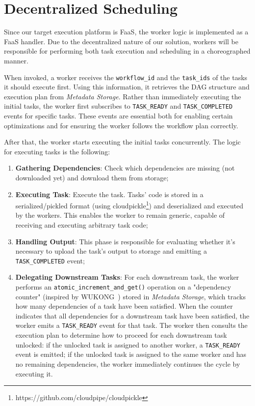 
\section{Decentralized Scheduling}

Since our target execution platform is FaaS, the worker logic is implemented as a FaaS handler. Due to the decentralized nature of our solution, workers will be responsible for performing both task execution and scheduling in a choreographed manner. 

When invoked, a worker receives the \texttt{workflow\_id} and the \texttt{task\_ids} of the tasks it should execute first. Using this information, it retrieves the DAG structure and execution plan from \textit{Metadata Storage}. Rather than immediately executing the initial tasks, the worker first subscribes to \texttt{TASK\_READY} and \texttt{TASK\_COMPLETED} events for specific tasks. These events are essential both for enabling certain optimizations and for ensuring the worker follows the workflow plan correctly.

After that, the worker starts executing the initial tasks concurrently. The logic for executing tasks is the following:
\begin{enumerate}
    \item \textbf{Gathering Dependencies}: Check which dependencies are missing (not downloaded yet) and download them from storage;
    \item \textbf{Executing Task}: Execute the task. Tasks' code is stored in a serialized/pickled format (using cloudpickle\footnote{https://github.com/cloudpipe/cloudpickle}) and deserialized and executed by the workers. This enables the worker to remain generic, capable of receiving and executing arbitrary task code;
    \item \textbf{Handling Output}: This phase is responsible for evaluating whether it's necessary to upload the task's output to storage and emitting a \texttt{TASK\_COMPLETED} event;
    \item \textbf{Delegating Downstream Tasks}: For each downstream task, the worker performs an \texttt{atomic\_increment\_and\_get()} operation on a "dependency counter" (inspired by WUKONG~\cite{wukong_2}) stored in \textit{Metadata Storage}, which tracks how many dependencies of a task have been satisfied. When the counter indicates that all dependencies for a downstream task have been satisfied, the worker emits a \texttt{TASK\_READY} event for that task. The worker then consults the execution plan to determine how to proceed for each downstream task unlocked: if the unlocked task is assigned to another worker, a \texttt{TASK\_READY} event is emitted; if the unlocked task is assigned to the same worker and has no remaining dependencies, the worker immediately continues the cycle by executing it.
\end{enumerate}

